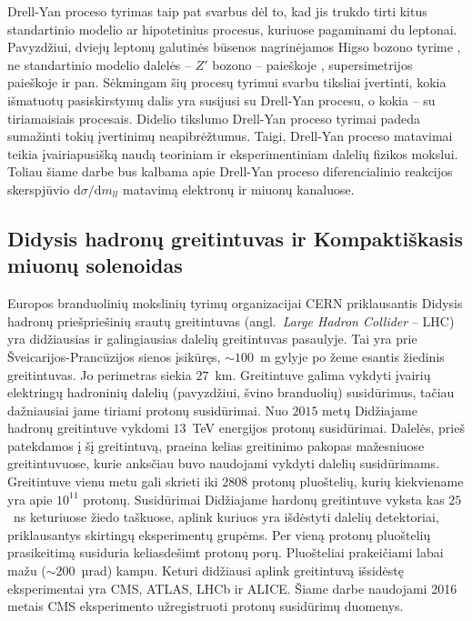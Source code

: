 \documentclass[a4paper, 12pt, oneside]{article}
\begin{document}
Drell-Yan proceso tyrimas taip pat svarbus dėl to, kad jis trukdo tirti kitus standartinio modelio ar hipotetinius procesus, kuriuose
pagaminami du leptonai.
Pavyzdžiui, dviejų leptonų galutinės būsenos nagrinėjamos Higso bozono tyrime \cite{Higgs2018}, ne standartinio modelio dalelės --
$Z'$ bozono -- paieškoje \cite{Zprime}, supersimetrijos paieškoje \cite{SUSYtau} ir pan.
Sėkmingam šių procesų tyrimui svarbu tiksliai įvertinti, kokia išmatuotų pasiskirstymų dalis yra susijusi su Drell-Yan procesu, o
kokia -- su tiriamaisiais procesais.
Didelio tikslumo Drell-Yan proceso tyrimai padeda sumažinti tokių įvertinimų neapibrėžtumus.
Taigi, Drell-Yan proceso matavimai teikia įvairiapusišką naudą teoriniam ir eksperimentiniam dalelių fizikos mokslui.
Toliau šiame darbe bus kalbama apie Drell-Yan proceso diferencialinio reakcijos skerspjūvio $\mathrm{d}\sigma/\mathrm{d}m_{ll}$ matavimą
elektronų ir miuonų kanaluose.

\subsection{Didysis hadronų greitintuvas ir Kompaktiškasis miuonų solenoidas}
Europos branduolinių mokslinių tyrimų organizacijai CERN priklausantis Didysis hadronų priešpriešinių srautų
greitintuvas (angl.\ \textit{Large Hadron Collider} -- LHC) \cite{LHC} yra didžiausias ir galingiausias dalelių greitintuvas pasaulyje.
Tai yra prie Šveicarijos-Prancūzijos sienos įsikūręs, $\sim\!\!100$~m gylyje po žeme esantis žiedinis greitintuvas.
Jo perimetras siekia $27$~km.
Greitintuve galima vykdyti įvairių elektringų hadroninių dalelių (pavyzdžiui, švino branduolių) susidūrimus, tačiau dažniausiai jame
tiriami protonų susidūrimai.
Nuo $2015$ metų Didžiajame hadronų greitintuve vykdomi $13$~TeV energijos protonų susidūrimai.
Dalelės, prieš patekdamos į šį greitintuvą, praeina kelias greitinimo pakopas mažesniuose greitintuvuose, kurie anksčiau buvo
naudojami vykdyti dalelių susidūrimams.
Greitintuve vienu metu gali skrieti iki $2808$ protonų pluoštelių, kurių kiekviename yra apie $10^{11}$ protonų.
Susidūrimai Didžiajame hardonų greitintuve vyksta kas $25$~ns keturiuose žiedo taškuose, aplink kuriuos yra išdėstyti dalelių
detektoriai, priklausantys skirtingų eksperimentų grupėms.
Per vieną protonų pluoštelių prasikeitimą susiduria keliasdešimt protonų porų.
Pluošteliai prakeičiami labai mažu ($\sim\!\!200$~µrad) kampu.
Keturi didžiausi aplink greitintuvą išsidėstę eksperimentai yra CMS, ATLAS, LHCb ir ALICE.
Šiame darbe naudojami 2016 metais CMS eksperimento užregistruoti protonų susidūrimų duomenys.
\end{document}
